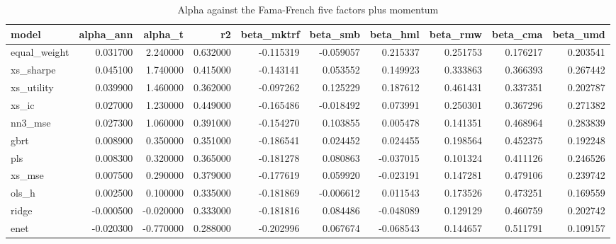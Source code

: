 \begin{table}
\caption{Alpha against the Fama-French five factors plus momentum}
\label{tab:t5_alpha}
\begin{tabular}{lrrrrrrrrr}
\toprule
model & alpha\_ann & alpha\_t & r2 & beta\_mktrf & beta\_smb & beta\_hml & beta\_rmw & beta\_cma & beta\_umd \\
\midrule
equal\_weight & 0.031700 & 2.240000 & 0.632000 & -0.115319 & -0.059057 & 0.215337 & 0.251753 & 0.176217 & 0.203541 \\
xs\_sharpe & 0.045100 & 1.740000 & 0.415000 & -0.143141 & 0.053552 & 0.149923 & 0.333863 & 0.366393 & 0.267442 \\
xs\_utility & 0.039900 & 1.460000 & 0.362000 & -0.097262 & 0.125229 & 0.187612 & 0.461431 & 0.337351 & 0.202787 \\
xs\_ic & 0.027000 & 1.230000 & 0.449000 & -0.165486 & -0.018492 & 0.073991 & 0.250301 & 0.367296 & 0.271382 \\
nn3\_mse & 0.027300 & 1.060000 & 0.391000 & -0.154270 & 0.103855 & 0.005478 & 0.141351 & 0.468964 & 0.283839 \\
gbrt & 0.008900 & 0.350000 & 0.351000 & -0.186541 & 0.024452 & 0.024455 & 0.198564 & 0.452375 & 0.192248 \\
pls & 0.008300 & 0.320000 & 0.365000 & -0.181278 & 0.080863 & -0.037015 & 0.101324 & 0.411126 & 0.246526 \\
xs\_mse & 0.007500 & 0.290000 & 0.379000 & -0.177619 & 0.059920 & -0.023191 & 0.147281 & 0.479106 & 0.239742 \\
ols\_h & 0.002500 & 0.100000 & 0.335000 & -0.181869 & -0.006612 & 0.011543 & 0.173526 & 0.473251 & 0.169559 \\
ridge & -0.000500 & -0.020000 & 0.333000 & -0.181816 & 0.084486 & -0.048089 & 0.129129 & 0.460759 & 0.202742 \\
enet & -0.020300 & -0.770000 & 0.288000 & -0.202996 & 0.067674 & -0.068543 & 0.144657 & 0.511791 & 0.109157 \\
\bottomrule
\end{tabular}
\end{table}
